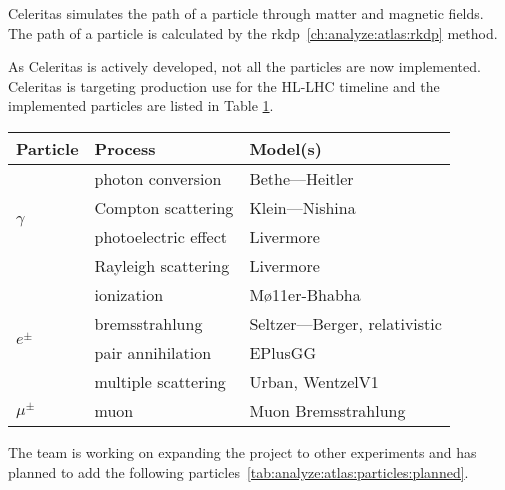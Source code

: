 Celeritas simulates the path of a particle through matter and magnetic fields.
The path of a particle is calculated by the \acrshort{rkdp}~\ref{ch:analyze:atlas:rkdp} method.


As Celeritas is actively developed, not all the particles are now implemented.
Celeritas is targeting production use for the HL-LHC timeline and the
implemented particles are listed in Table \ref{tab:analyze:atlas:particles:implemented}.

\begin{table}[ht]
    \centering
    \begin{tabular}{lll}
        \hline
        \textbf{Particle}         & \textbf{Process}     & \textbf{Model(s)}            \\
        \hline
        \multirow{4}{*}{$\gamma$} & photon conversion    & Bethe—Heitler                \\
                                  & Compton scattering   & Klein—Nishina                \\
                                  & photoelectric effect & Livermore                    \\
                                  & Rayleigh scattering  & Livermore                    \\
        \hline
        \multirow{4}{*}{$e^\pm$}  & ionization           & Mø11er-Bhabha                \\
                                  & bremsstrahlung       & Seltzer—Berger, relativistic \\
                                  & pair annihilation    & EPlusGG                      \\
                                  & multiple scattering  & Urban, WentzelV1             \\
        \hline
        $\mu^\pm$                 & muon                 & Muon Bremsstrahlung          \\
        \hline
    \end{tabular}
    \label{tab:analyze:atlas:particles:implemented}
\end{table}

The team is working on expanding the project to other experiments and has planned
to add the following particles~\ref{tab:analyze:atlas:particles:planned}.

